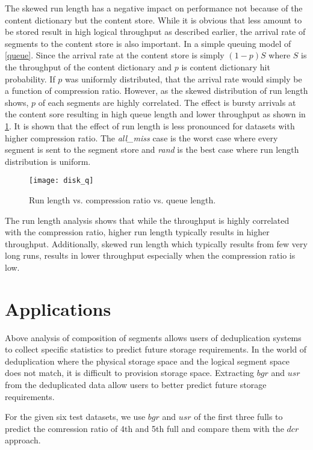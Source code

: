 The skewed run length has a negative impact on performance not because of the content dictionary but the content store. While it is obvious that less amount to be stored result in high logical throughput as described earlier, the arrival rate of segments to the content store is also important. In a simple queuing model of \figurename \ref{queue}. Since the arrival rate at the content store is simply $(1-p)S$ where $S$ is the throughput of the content dictionary and $p$ is content dictionary hit probability. If $p$ was uniformly distributed, that the arrival rate would simply be a function of compression ratio. However, as the skewed distribution of run length shows, $p$ of each segments are highly correlated. The effect is bursty arrivals at the content sore resulting in high queue length and lower throughput as shown in \figurename \ref{ql}. It is shown that the effect of run length is less pronounced for datasets with higher compression ratio. The \emph{all\_miss} case is the worst case where every segment is sent to the segment store and \emph{rand} is the best case where run length distribution is uniform.
 
\begin{figure}[!t]
\centering
\texttt{[image: disk\_q]}
\caption{Run length vs. compression ratio vs. queue length.}
\label{ql}
\end{figure}

The run length analysis shows that while the throughput is highly correlated with the compression ratio, higher run length typically results in higher throughput. Additionally, skewed run length which typically results from few very long runs, results in lower throughput especially when the compression ratio is low.

\section{Applications}\label{appp}
Above analysis of composition of segments allows users of deduplication systems to collect specific statistics to predict future storage requirements. In the world of deduplication where the physical storage space and the logical segment space does not match, it is difficult to provision storage space. Extracting $bgr$ and $usr$ from the deduplicated data allow users to better predict future storage requirements. 

For the given six test datasets, we use $bgr$ and $usr$ of the first three fulls to predict the comression ratio of 4th and 5th full and compare them with the $dcr$ approach.

